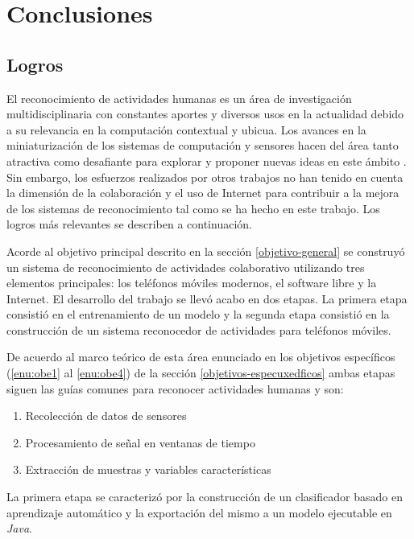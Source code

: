 
\chapter{Conclusiones}

\label{conclusiones-y-trabajos-futuros}

\section{Logros}

\label{conclusiones}

El reconocimiento de actividades humanas es un área de investigación
multidisciplinaria con constantes aportes y diversos usos en la actualidad
debido a su relevancia en la computación contextual y ubicua. Los
avances en la miniaturización de los sistemas de computación y sensores
hacen del área tanto atractiva como desafiante para explorar y proponer
nuevas ideas en este ámbito \cite{LaraLabrador2013}. Sin embargo,
los esfuerzos realizados por otros trabajos no han tenido en cuenta
la dimensión de la colaboración y el uso de Internet para contribuir
a la mejora de los sistemas de reconocimiento tal como se ha hecho
en este trabajo. Los logros más relevantes se describen a continuación.

Acorde al objetivo principal descrito en la sección \ref{objetivo-general}
se construyó un sistema de reconocimiento de actividades colaborativo
utilizando tres elementos principales: los teléfonos móviles modernos,
el software libre y la Internet. El desarrollo del trabajo se llevó
acabo en dos etapas. La primera etapa consistió en el entrenamiento
de un modelo y la segunda etapa consistió en la construcción de un
sistema reconocedor de actividades para teléfonos móviles.

De acuerdo al marco teórico de esta área enunciado en los objetivos
específicos (\ref{enu:obe1} al \ref{enu:obe4}) de la sección \ref{objetivos-especuxedficos}
ambas etapas siguen las guías comunes para reconocer actividades humanas
y son:
\begin{enumerate}
\item Recolección de datos de sensores
\item Procesamiento de señal en ventanas de tiempo
\item Extracción de muestras y variables características
\end{enumerate}
La primera etapa se caracterizó por la construcción de un clasificador
basado en aprendizaje automático y la exportación del mismo a un modelo
ejecutable en \emph{Java}.

